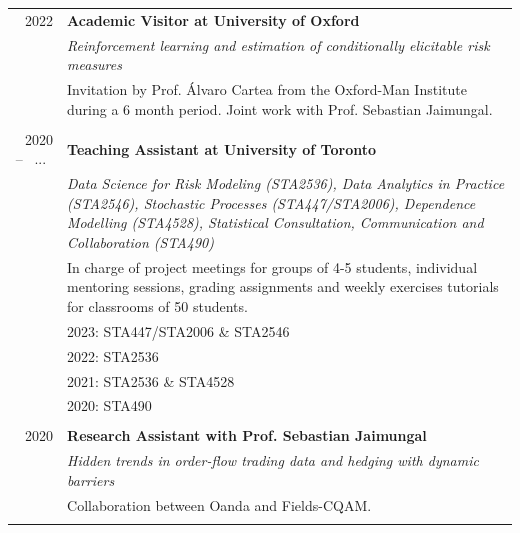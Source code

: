 \documentclass[11pt, sans]{moderncv}
\begin{document}
\begin{longtable}{rp{13.34cm}}
	2022 \hspace{10pt}& \textbf{Academic Visitor at University of Oxford} \\
	&\textit{Reinforcement learning and estimation of conditionally elicitable risk measures}\\
	\vspace{-5pt}
	&{\small Invitation by Prof. Álvaro Cartea from the Oxford-Man Institute during a 6 month period. Joint work with Prof. Sebastian Jaimungal.}\\
	&\\

	2020 -- $\,$ ... $\,$ \hspace{10pt}& \textbf{Teaching Assistant at University of Toronto} \\
	&\textit{Data Science for Risk Modeling (STA2536), Data Analytics in Practice (STA2546), Stochastic Processes (STA447/STA2006), Dependence Modelling (STA4528), Statistical Consultation, Communication and Collaboration (STA490)}\\
	\vspace{-5pt}
	&{\small In charge of project meetings for groups of 4-5 students, individual mentoring sessions, grading assignments and weekly exercises tutorials for classrooms of 50 students.}\\
	\vspace{-10pt}
	&{\small \color{gray}{$\circ$}} {\small 2023: STA447/STA2006 \& STA2546}\\
	\vspace{-10pt}
	&{\small \color{gray}{$\circ$}} {\small 2022: STA2536}\\
	\vspace{-10pt}
	&{\small \color{gray}{$\circ$}} {\small 2021: STA2536 \& STA4528}\\
	&{\small \color{gray}{$\circ$}} {\small 2020: STA490}\\
	&\\
	
	2020 \hspace{10pt}& \textbf{Research Assistant with Prof. Sebastian Jaimungal} \\
	&\textit{Hidden trends in order-flow trading data and hedging with dynamic barriers}\\
	&{\small Collaboration between Oanda and Fields-CQAM.}\\
	&\\
	

\end{longtable}
\end{document}
